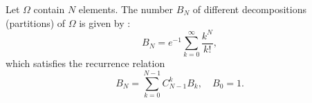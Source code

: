 Let $\Omega$ contain $N$ elements. The number $B_N$ of different decompositions (partitions) of $\Omega$ is given by :
$$B_N = e^{-1} \sum_{k=0}^{\infty} \frac{k^N}{k!},$$
which satisfies the recurrence relation
$$B_N = \sum_{k=0}^{N-1} C_{N-1}^{k} B_k, \quad B_0 = 1.$$
